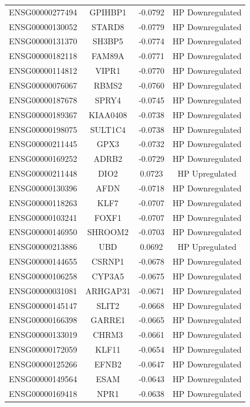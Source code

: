 \documentclass[
]{article}
\begin{document}
\begin{singlespace}
\begin{longtable}[t]{lccc}
ENSG00000277494 & GPIHBP1 & -0.0792 & HP Downregulated\\
\addlinespace
ENSG00000130052 & STARD8 & -0.0779 & HP Downregulated\\
ENSG00000131370 & SH3BP5 & -0.0774 & HP Downregulated\\
ENSG00000182118 & FAM89A & -0.0771 & HP Downregulated\\
ENSG00000114812 & VIPR1 & -0.0770 & HP Downregulated\\
ENSG00000076067 & RBMS2 & -0.0760 & HP Downregulated\\
\addlinespace
ENSG00000187678 & SPRY4 & -0.0745 & HP Downregulated\\
ENSG00000189367 & KIAA0408 & -0.0738 & HP Downregulated\\
ENSG00000198075 & SULT1C4 & -0.0738 & HP Downregulated\\
ENSG00000211445 & GPX3 & -0.0732 & HP Downregulated\\
ENSG00000169252 & ADRB2 & -0.0729 & HP Downregulated\\
\addlinespace
ENSG00000211448 & DIO2 & 0.0723 & HP Upregulated\\
ENSG00000130396 & AFDN & -0.0718 & HP Downregulated\\
ENSG00000118263 & KLF7 & -0.0707 & HP Downregulated\\
ENSG00000103241 & FOXF1 & -0.0707 & HP Downregulated\\
ENSG00000146950 & SHROOM2 & -0.0703 & HP Downregulated\\
\addlinespace
ENSG00000213886 & UBD & 0.0692 & HP Upregulated\\
ENSG00000144655 & CSRNP1 & -0.0678 & HP Downregulated\\
ENSG00000106258 & CYP3A5 & -0.0675 & HP Downregulated\\
ENSG00000031081 & ARHGAP31 & -0.0671 & HP Downregulated\\
ENSG00000145147 & SLIT2 & -0.0668 & HP Downregulated\\
\addlinespace
ENSG00000166398 & GARRE1 & -0.0665 & HP Downregulated\\
ENSG00000133019 & CHRM3 & -0.0661 & HP Downregulated\\
ENSG00000172059 & KLF11 & -0.0654 & HP Downregulated\\
ENSG00000125266 & EFNB2 & -0.0647 & HP Downregulated\\
ENSG00000149564 & ESAM & -0.0643 & HP Downregulated\\
\addlinespace
ENSG00000169418 & NPR1 & -0.0638 & HP Downregulated\\

\end{longtable}
\end{singlespace}
\end{document}
